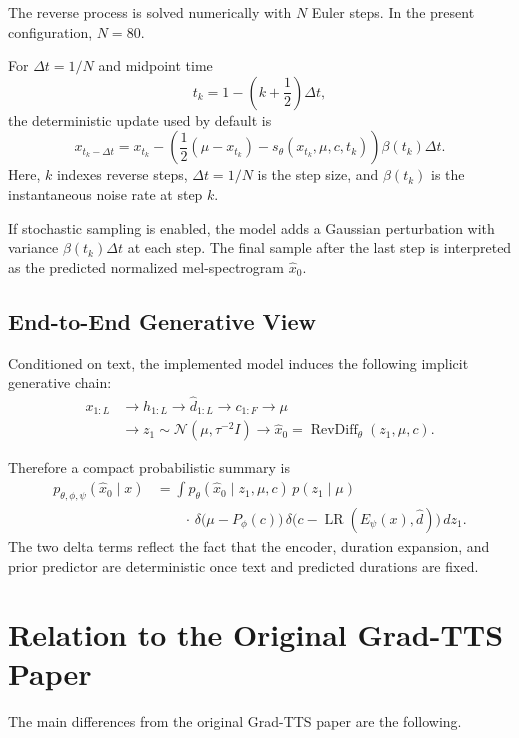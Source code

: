 \documentclass[11pt,a4paper]{article}
\begin{document}
The reverse process is solved numerically with $N$ Euler steps. In the present configuration, $N=80$.

For $\Delta t = 1/N$ and midpoint time
\[
t_k = 1 - \left(k+\frac{1}{2}\right)\Delta t,
\]
the deterministic update used by default is
\[
x_{t_k-\Delta t}
=
x_{t_k}
-
\left(
\frac{1}{2}(\mu - x_{t_k}) - s_{\theta}(x_{t_k},\mu,c,t_k)
\right)\beta(t_k)\Delta t.
\]
Here, $k$ indexes reverse steps, $\Delta t = 1/N$ is the step size, and $\beta(t_k)$ is the instantaneous noise rate at step $k$.

If stochastic sampling is enabled, the model adds a Gaussian perturbation with variance $\beta(t_k)\Delta t$ at each step. The final sample after the last step is interpreted as the predicted normalized mel-spectrogram $\hat{x}_0$.

\subsection{End-to-End Generative View}

Conditioned on text, the implemented model induces the following implicit generative chain:
\[
\begin{aligned}
x_{1:L}
&\longrightarrow
h_{1:L}
\longrightarrow
\hat{d}_{1:L}
\longrightarrow
c_{1:F}
\longrightarrow
\mu
\\
&\longrightarrow
z_1 \sim \mathcal{N}(\mu,\tau^{-2}I)
\longrightarrow
\hat{x}_0 = \operatorname{RevDiff}_{\theta}(z_1,\mu,c).
\end{aligned}
\]

Therefore a compact probabilistic summary is
\[
\begin{aligned}
p_{\theta,\phi,\psi}(\hat{x}_0 \mid x)
&=
\int
p_{\theta}(\hat{x}_0 \mid z_1,\mu,c)\,
p(z_1 \mid \mu)
\\
&\qquad \cdot\,
\delta\!\big(\mu-P_{\phi}(c)\big)\,
\delta\!\big(c-\operatorname{LR}(E_{\psi}(x),\hat{d})\big)\,
dz_1.
\end{aligned}
\]
The two delta terms reflect the fact that the encoder, duration expansion, and prior predictor are deterministic once text and predicted durations are fixed.

\section{Relation to the Original Grad-TTS Paper}

The main differences from the original Grad-TTS paper are the following.
\end{document}
